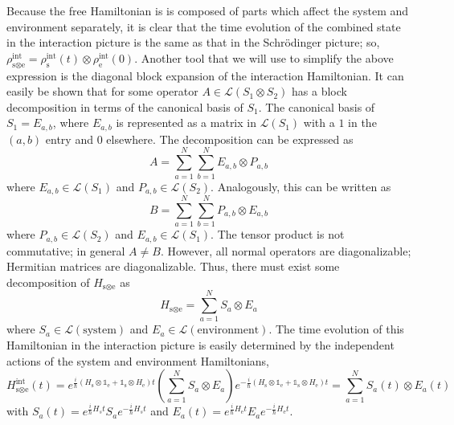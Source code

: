 \documentclass{article}
\begin{document}
Because the free Hamiltonian is is composed of parts which affect the system and
environment separately, it is clear that the time evolution of the combined
state in the interaction picture is the same as that in the Schr\"{o}dinger
picture; so, $ \rho_{\textrm{s} \otimes \textrm{e}}^{\textrm{int}} =
\rho^{\textrm{int}}_{\textrm{s}}(t) \otimes
\rho^{\textrm{int}}_{\textrm{e}}(0)$. Another tool that we will use to simplify
the above expression is the diagonal block expansion of the interaction
Hamiltonian. It can easily be shown that for some operator $ A \in
\mathcal{L}(S_{1} \otimes S_{2}) $ has a block decomposition in terms of the
canonical basis of $ S_{1} $. The canonical basis of $ S_{1} = E_{a,b} $, where
$ E_{a,b} $ is represented as a matrix in $ \mathcal{L}(S_{1}) $ with a $ 1 $ in
the $ (a,b) $ entry and $ 0 $ elsewhere. The decomposition can be expressed as
\begin{equation}
   A = \sum^{N}_{a=1} \sum^{N}_{b=1} E_{a,b} \otimes P_{a,b}
\end{equation}
where $ E_{a,b} \in \mathcal{L}(S_{1}) $
and $ P_{a,b} \in \mathcal{L}(S_{2}) $. Analogously, this can be written as
\begin{equation}
   B = \sum^{N}_{a=1} \sum^{N}_{b=1} P_{a,b} \otimes E_{a,b}
\end{equation}
where $ P_{a,b} \in \mathcal{L}(S_{2}) $ and $ E_{a,b} \in \mathcal{L}(S_{1}) $.
The tensor product is not commutative; in general $ A \ne B $. However, all
normal operators are diagonalizable; Hermitian matrices are diagonalizable.
Thus, there must exist some decomposition
of $ H_{\textrm{s} \otimes \textrm{e}} $ as
\begin{equation}
    H_{\textrm{s} \otimes \textrm{e}} = \sum^{N}_{a=1} S_{a} \otimes E_{a}
\end{equation}
where $ S_{a} \in \mathcal{L}(\textrm{system}) $ and $ E_{a} \in
\mathcal{L}(\textrm{environment}) $. The time evolution of this Hamiltonian in
the interaction picture is easily determined by the independent actions of the
system and environment Hamiltonians,
\begin{equation}
   H_{\textrm{s} \otimes \textrm{e}}^{\textrm{int}}(t)
   = e^{\frac{i}{\hbar} \left(
      H_{\textrm{s}}
      \otimes \mathds{1}_{\textrm{e}} + \mathds{1}_{\textrm{s}} \otimes
   H_{\textrm{e}} \right)t}
   \left( \sum^{N}_{a=1} S_{a} \otimes E_{a} \right)
   e^{-\frac{i}{\hbar} \left(
      H_{\textrm{s}}
      \otimes \mathds{1}_{\textrm{e}} + \mathds{1}_{\textrm{s}} \otimes
   H_{\textrm{e}} \right)t}
   = \sum^{N}_{a=1} S_{a}(t) \otimes E_{a}(t)
\end{equation}
with $ S_{a}(t) = e^{\frac{i}{\hbar} H_{s}  t } S_{a} e^{-\frac{i}{\hbar} H_{s}
t } $ and
$ E_{a}(t) =  e^{\frac{i}{\hbar}
H_{\textrm{e}} t } E_{a} e^{-\frac{i}{\hbar}
H_{\textrm{e}} t } $.
\end{document}
